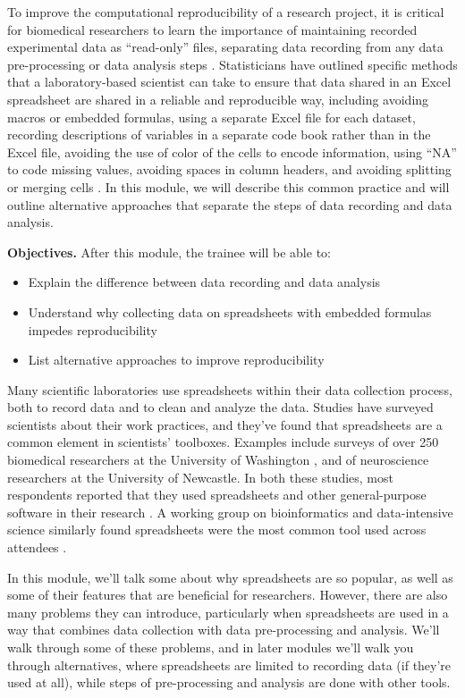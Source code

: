 \documentclass[]{tufte-book}
\providecommand{\tightlist}{%
  \setlength{\itemsep}{0pt}\setlength{\parskip}{0pt}}
\begin{document}
To improve the computational reproducibility of a research project, it is
critical for biomedical researchers to learn the importance of maintaining
recorded experimental data as ``read-only'' files, separating data recording from
any data pre-processing or data analysis steps \citep{broman2018data, marwick2018packaging}. Statisticians have outlined specific methods that a
laboratory-based scientist can take to ensure that data shared in an Excel
spreadsheet are shared in a reliable and reproducible way, including avoiding
macros or embedded formulas, using a separate Excel file for each dataset,
recording descriptions of variables in a separate code book rather than in the
Excel file, avoiding the use of color of the cells to encode information, using
``NA'' to code missing values, avoiding spaces in column headers, and avoiding
splitting or merging cells \citep{ellis2018share, broman2018data}. In this module,
we will describe this common practice and will outline alternative approaches
that separate the steps of data recording and data analysis.

\textbf{Objectives.} After this module, the trainee will be able to:

\begin{itemize}
\tightlist
\item
  Explain the difference between data recording and data analysis
\item
  Understand why collecting data on spreadsheets with embedded formulas impedes
  reproducibility
\item
  List alternative approaches to improve reproducibility
\end{itemize}

Many scientific laboratories use spreadsheets within their data collection
process, both to record data and to clean and analyze the data. Studies have
surveyed scientists about their work practices, and they've found that
spreadsheets are a common element in scientists' toolboxes. Examples include
surveys of over 250 biomedical researchers at the University of Washington
\citep{anderson2007issues}, and of neuroscience researchers at the University of
Newcastle. In both these studies, most respondents reported that they used
spreadsheets and other general-purpose software in their research
\citep{altarawneh2017pilot}. A working group on bioinformatics and data-intensive
science similarly found spreadsheets were the most common tool used across
attendees \citep{barga2011bioinformatics}.

In this module, we'll talk some about why spreadsheets are so popular, as well
as some of their features that are beneficial for researchers. However, there
are also many problems they can introduce, particularly when spreadsheets are
used in a way that combines data collection with data pre-processing and analysis.
We'll walk through some of these problems, and in later modules we'll walk you
through alternatives, where spreadsheets are limited to recording data (if they're
used at all), while steps of pre-processing and analysis are done with other
tools.
\end{document}
